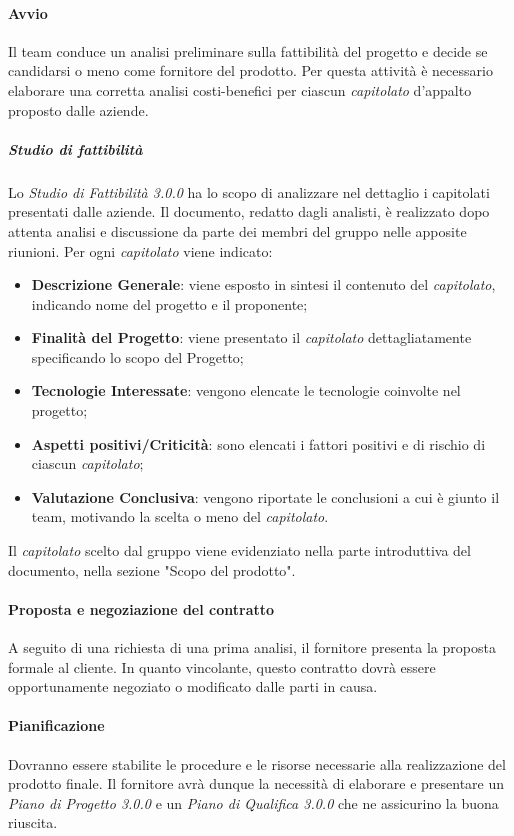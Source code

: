 \paragraph{Avvio}
Il team conduce un analisi preliminare sulla fattibilità del progetto e decide se candidarsi o meno come fornitore del prodotto. Per questa attività è necessario elaborare una corretta analisi costi-benefici per ciascun \textit{capitolato\glo} d'appalto proposto dalle aziende.
\subparagraph*{Studio di fattibilità}
Lo \textit{Studio di Fattibilità 3.0.0\doc} ha lo scopo di analizzare nel dettaglio i capitolati presentati dalle aziende. Il documento,  redatto dagli analisti, è realizzato dopo attenta analisi e discussione da parte dei membri del gruppo nelle apposite riunioni. Per ogni \textit{capitolato\glo} viene indicato:
\begin{itemize}
	\item \textbf{Descrizione Generale}: viene esposto in sintesi il contenuto del \textit{capitolato\glos}, indicando nome del progetto e il proponente;
	\item \textbf{Finalità del Progetto}: viene presentato il \textit{capitolato\glo} dettagliatamente specificando lo scopo del Progetto;
	\item \textbf{Tecnologie Interessate}: vengono elencate le tecnologie coinvolte nel progetto;
	\item \textbf{Aspetti positivi/Criticità}: sono elencati i fattori positivi e di rischio di ciascun \textit{capitolato\glos};
	\item \textbf{Valutazione Conclusiva}: vengono riportate le conclusioni a cui è giunto il team, motivando la scelta o meno del \textit{capitolato\glos}.
\end{itemize}
Il \textit{capitolato\glo} scelto dal gruppo viene evidenziato nella parte introduttiva del documento, nella sezione "Scopo del prodotto".

\paragraph{Proposta e negoziazione del contratto}
A seguito di una richiesta di una prima analisi, il fornitore presenta la proposta formale al cliente. In quanto vincolante, questo contratto dovrà essere opportunamente negoziato o modificato dalle parti in causa.

\paragraph{Pianificazione}  Dovranno essere stabilite le procedure e le risorse necessarie alla realizzazione del prodotto finale. Il fornitore avrà dunque la necessità di elaborare e presentare un \textit{Piano di Progetto 3.0.0\doc} e un \textit{Piano di Qualifica 3.0.0\doc} che ne assicurino la buona riuscita.

